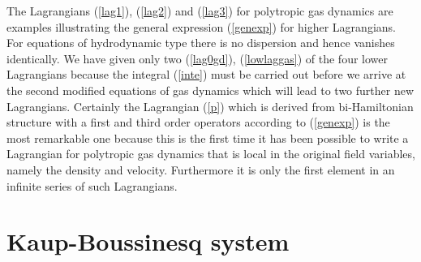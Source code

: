\documentclass[a4paper,12pt]{article}
\begin{document}
The Lagrangians (\ref{lag1}), (\ref{lag2}) and (\ref{lag3}) for
polytropic gas dynamics are examples illustrating the general
expression (\ref{genexp}) for higher Lagrangians. For equations of
hydrodynamic type there is no dispersion and hence \coordHE{}
vanishes identically. We have given only two (\ref{lag0gd}),
(\ref{lowlaggas}) of the four lower Lagrangians because the
integral (\ref{inte}) must be carried out before we arrive at the
second modified equations of gas dynamics which will lead to two
further new Lagrangians. Certainly the Lagrangian (\ref{p}) which
is derived from bi-Hamiltonian structure with a first and third
order operators according to (\ref{genexp}) is the most remarkable
one because this is the first time it has been possible to write a
Lagrangian for polytropic gas dynamics that is local in the
original field variables, namely the density and velocity.
Furthermore it is only the first element in an infinite series of
such Lagrangians.

\section{Kaup-Boussinesq system}
\end{document}
